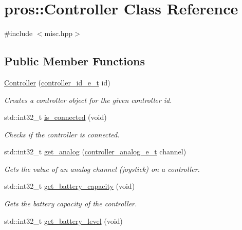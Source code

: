 \hypertarget{classpros_1_1Controller}{}\section{pros\+::Controller Class Reference}
\label{classpros_1_1Controller}


{\ttfamily \#include $<$misc.\+hpp$>$}

\subsection*{Public Member Functions}
\begin{DoxyCompactItemize}
\item 
\mbox{\hyperlink{classpros_1_1Controller_ae9d9ead11894048b383e9e82ef46d5ad}{Controller}} (\mbox{\hyperlink{misc_8h_af1323f00203099060d46f722b1fbd460}{controller\+\_\+id\+\_\+e\+\_\+t}} id)
\begin{DoxyCompactList}\small\item\em Creates a controller object for the given controller id. \end{DoxyCompactList}\item 
std\+::int32\+\_\+t \mbox{\hyperlink{classpros_1_1Controller_a1a013e9cf1979487f2daabcd729d3ecb}{is\+\_\+connected}} (void)
\begin{DoxyCompactList}\small\item\em Checks if the controller is connected. \end{DoxyCompactList}\item 
std\+::int32\+\_\+t \mbox{\hyperlink{classpros_1_1Controller_ace3038684aa3cf14f06279c54eeb1105}{get\+\_\+analog}} (\mbox{\hyperlink{misc_8h_a8bdd0963e2bc0d4fbe03435eee8a5ca5}{controller\+\_\+analog\+\_\+e\+\_\+t}} channel)
\begin{DoxyCompactList}\small\item\em Gets the value of an analog channel (joystick) on a controller. \end{DoxyCompactList}\item 
std\+::int32\+\_\+t \mbox{\hyperlink{classpros_1_1Controller_a7d85ecacfd46161ddb2be08d856ca130}{get\+\_\+battery\+\_\+capacity}} (void)
\begin{DoxyCompactList}\small\item\em Gets the battery capacity of the controller. \end{DoxyCompactList}\item 
std\+::int32\+\_\+t \mbox{\hyperlink{classpros_1_1Controller_a8fd8b131f13f2f7702b5299dab82fdaf}{get\+\_\+battery\+\_\+level}} (void)

\end{DoxyCompactItemize}

